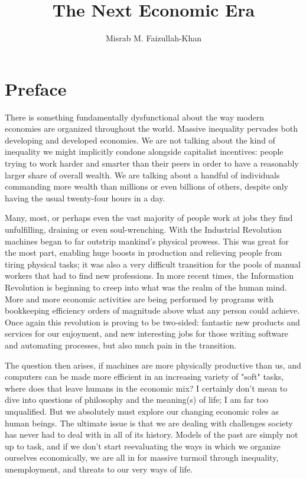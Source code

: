 \documentclass[12pt]{memoir}
\begin{document}
	\title{The Next Economic Era}
	\date{}
	\author{Misrab M. Faizullah-Khan}
	
	\maketitle
	
	\chapter*{Preface}
		
		There is something fundamentally dysfunctional about the way modern economies are organized throughout the world. Massive inequality pervades both developing and developed economies. 
		We are not talking about the kind of inequality we might implicitly condone alongside capitalist incentives: people trying to work harder and smarter than their peers in order to 
		have a reasonably larger share of overall wealth. We are talking about a handful of individuals commanding more wealth than millions or even billions of others, 
		despite only having the usual twenty-four hours in a day.\
		
		Many, most, or perhaps even the vast majority of people work at jobs they find unfulfilling, draining or even soul-wrenching. With the Industrial Revolution machines  began to far outstrip mankind's 
		physical prowess. This was great for the most part, enabling huge boosts in production and relieving people from tiring physical tasks; it was also a very difficult transition for the pools of manual workers 
		that had to find new professions. In more recent times, the Information Revolution is beginning to creep into what was the realm of the human mind. More and more economic activities are being 
		performed by programs with bookkeeping efficiency orders of magnitude above what any person could achieve. Once again this revolution is proving to be two-sided: fantastic new products and services 
		for our enjoyment, and new interesting jobs for those writing software and automating processes, but also much pain in the transition.\
		
		The question then arises, if machines are more physically productive than us, and computers can be made more efficient in an increasing variety of "soft" tasks, where does that leave humans in the economic 
		mix? I certainly don't mean to dive into questions of philosophy and the meaning(s) of life; I am far too unqualified. But we absolutely must explore our changing economic roles as human beings. The 
		ultimate issue is that we are dealing with challenges society has never had to deal with in all of its history. Models of the past are simply not up to task, and if we don't start reevaluating the ways in which 
		we organize ourselves economically, we are all in for massive turmoil through inequality, unemployment, and threats to our very ways of life.\
		
\end{document}
